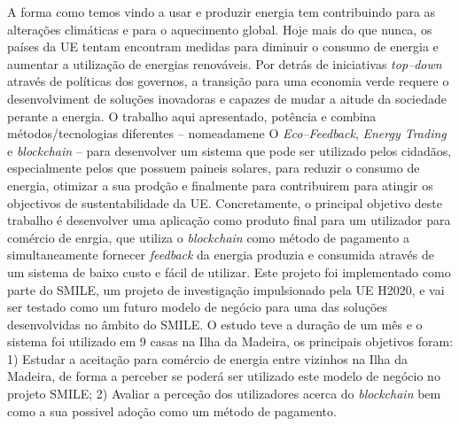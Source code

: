 \noindent 
A forma como temos vindo a usar e produzir energia tem contribuindo para as alterações climáticas e para o aquecimento global. 
Hoje mais do que nunca, os países da \ac{UE} tentam encontram medidas para diminuir o consumo de energia e aumentar a utilização de energias renováveis. Por detrás de iniciativas \textit{top--down} através de políticas dos governos, a transição para uma economia verde requere o desenvolviment de soluções inovadoras e capazes de mudar a aitude da sociedade perante a energia. O trabalho aqui apresentado, potência e combina métodos/tecnologias diferentes -- nomeadamene O \textit{Eco--Feedback}, \textit{Energy Trading} e  \textit{blockchain} -- para desenvolver um sistema que pode ser utilizado pelos cidadãos, especialmente pelos que possuem paineis solares, para reduzir o consumo de energia, otimizar a sua prodção e finalmente para contribuirem para atingir os objectivos de sustentabilidade da \ac{UE}. 
Concretamente, o principal objetivo deste trabalho é desenvolver uma aplicação como produto final para um utilizador para comércio de enrgia, que utiliza o \textit{blockchain} como método de pagamento a simultaneamente fornecer \textit{feedback} da energia produzia e consumida através de um sistema de baixo custo e fácil de utilizar.
Este projeto foi implementado como parte do \ac{SMILE}, um projeto de investigação impulsionado pela \ac{UE} H2020, e vai ser testado como um futuro modelo de negócio para uma das soluções desenvolvidas no âmbito do \ac{SMILE}. 
O estudo teve a duração de um mês e o sistema foi utilizado em 9 casas na Ilha da Madeira, os principais objetivos foram: 1) Estudar a aceitação para comércio de energia entre vizinhos na Ilha da Madeira, de forma a perceber se poderá ser utilizado este modelo de negócio no projeto \ac{SMILE}; 2) Avaliar a perceção dos utilizadores acerca do \textit{blockchain} bem como a sua possivel adoção como um método de pagamento. 
